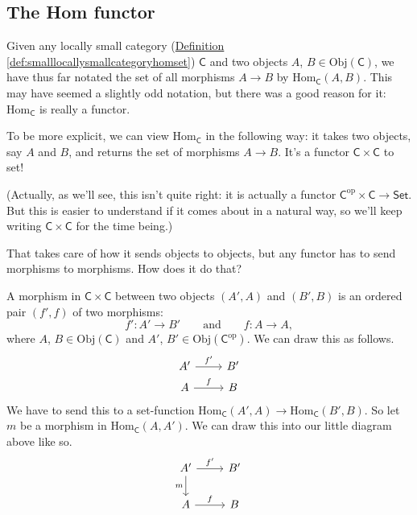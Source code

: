 \documentclass[a4paper]{report}
\newcommand{\Obj}{\mathrm{Obj}}
\newcommand{\Hom}{\mathrm{Hom}}
\theoremstyle{definition}
\theoremstyle{plain}
\theoremstyle{remark}
\begin{document}
\subsection{The Hom functor} \label{section:homfunctor}
Given any locally small category (\hyperref[def:smalllocallysmallcategoryhomset]{Definition \ref*{def:smalllocallysmallcategoryhomset}}) $\mathsf{C}$ and two objects $A$, $B \in \Obj(\mathsf{C})$, we have thus far notated the set of all morphisms $A \to B$ by $\Hom_{\mathsf{C}}(A, B)$. This may have seemed a slightly odd notation, but there was a good reason for it: $\Hom_{\mathsf{C}}$ is really a functor.

To be more explicit, we can view $\Hom_{\mathsf{C}}$ in the following way: it takes two objects, say $A$ and $B$, and returns the set of morphisms $A \to B$. It's a functor $\mathsf{C} \times \mathsf{C}$ to set!

(Actually, as we'll see, this isn't quite right: it is actually a functor $\mathsf{C}^{\text{op}} \times \mathsf{C} \to \mathsf{Set}$. But this is easier to understand if it comes about in a natural way, so we'll keep writing $\mathsf{C} \times \mathsf{C}$ for the time being.)

That takes care of how it sends objects to objects, but any functor has to send morphisms to morphisms. How does it do that?

A morphism in $\mathsf{C} \times \mathsf{C}$ between two objects $(A', A)$ and $(B', B)$ is an ordered pair $(f', f)$ of two morphisms:
\begin{equation*}
  f'\colon A' \to B'\qquad\text{and}\qquad f\colon A \to A,
\end{equation*}
where $A$, $B \in \Obj(\mathsf{C})$ and $A'$, $B' \in \Obj(\mathsf{C}^{\mathrm{op}})$. We can draw this as follows.
\begin{equation*}
  \begin{tikzcd}[row sep=tiny]
    A' 
    \arrow[r, "f'"]
    & B'
    \\
    A
    \arrow[r, "f"]
    & B
  \end{tikzcd}
\end{equation*}
We have to send this to a set-function $\Hom_{\mathsf{C}}(A', A) \to \Hom_{\mathsf{C}}(B', B)$. So let $m$ be a morphism in $\Hom_{\mathsf{C}}(A, A')$. We can draw this into our little diagram above like so.
\begin{equation*}
  \begin{tikzcd}
    A' 
    \arrow[r, "f'"]
    \arrow[d, swap, "m"]
    & B'
    \\
    A
    \arrow[r, "f"]
    & B
  \end{tikzcd}
\end{equation*}
\end{document}
